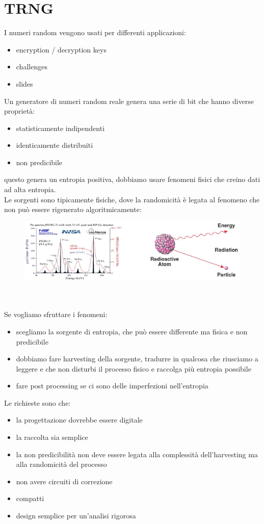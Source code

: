 \documentclass[oneside, 12pt]{extbook}
\begin{document}
\section{TRNG}
I numeri random vengono usati per differenti applicazioni:
\begin{itemize}
	\item encryption / decryption keys
	\item challenges 
	\item slides
\end{itemize}
Un generatore di numeri random reale genera una serie di bit che hanno diverse proprietà:
\begin{itemize}
	\item statisticamente indipendenti
	\item identicamente distribuiti
	\item non predicibile
\end{itemize}
questo genera un entropia positiva, dobbiamo usare fenomeni fisici che creino dati ad alta entropia.
\\Le sorgenti sono tipicamente fisiche, dove la randomicità è legata al fenomeno che non può essere rigenerato algoritmicamente:\\
\begin{figure}[!h]
	\includegraphics[scale=0.4]{immagini/hardware/source_rand.png}
\end{figure}
\\\\Se vogliamo sfruttare i fenomeni:
\begin{itemize}
	\item scegliamo la sorgente di entropia, che può essere differente ma fisica e non predicibile
	\item dobbiamo fare harvesting della sorgente, tradurre in qualcosa che riusciamo a leggere e che non disturbi il processo fisico e raccolga più entropia possibile
	\item fare post processing se ci sono delle imperfezioni nell'entropia
\end{itemize}
Le richieste sono che:
\begin{itemize}
	\item la progettazione dovrebbe essere digitale
	\item la raccolta sia semplice
	\item la non predicibilità non deve essere legata alla complessità dell'harvesting ma alla randomicità del processo
	\item non avere circuiti di correzione 
	\item compatti
	\item design semplice per un'analisi rigorosa
\end{itemize}
\end{document}
